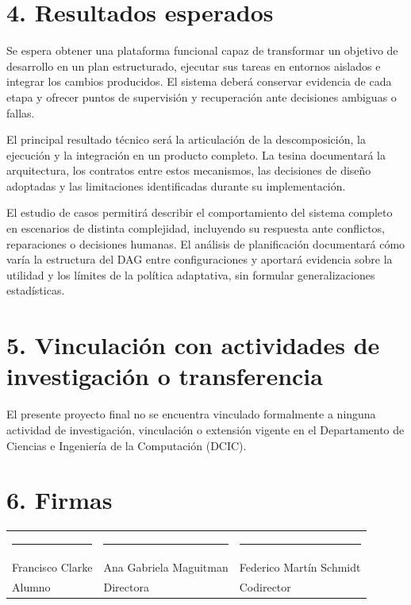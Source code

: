 \documentclass[11pt,a4paper]{article}
\newcommand{\autor}{Francisco Clarke}
\newcommand{\director}{Ana Gabriela Maguitman}
\newcommand{\codirector}{Federico Mart\'in Schmidt}
\begin{document}
\section*{4. Resultados esperados}

Se espera obtener una plataforma funcional capaz de transformar un objetivo de
desarrollo en un plan estructurado, ejecutar sus tareas en entornos aislados e
integrar los cambios producidos. El sistema deber\'a conservar evidencia de cada
etapa y ofrecer puntos de supervisi\'on y recuperaci\'on ante decisiones ambiguas
o fallas.

El principal resultado t\'ecnico ser\'a la articulaci\'on de la descomposici\'on,
la ejecuci\'on y la integraci\'on en un producto completo. La tesina documentar\'a
la arquitectura, los contratos entre estos mecanismos, las decisiones de
dise\~no adoptadas y las limitaciones identificadas durante su implementaci\'on.

El estudio de casos permitir\'a describir el comportamiento del sistema completo
en escenarios de distinta complejidad, incluyendo su respuesta ante conflictos,
reparaciones o decisiones humanas. El an\'alisis de planificaci\'on documentar\'a
c\'omo var\'ia la estructura del DAG entre configuraciones y aportar\'a evidencia
sobre la utilidad y los l\'imites de la pol\'itica adaptativa, sin formular
generalizaciones estad\'isticas.

\section*{5. Vinculaci\'on con actividades de investigaci\'on o transferencia}

El presente proyecto final no se encuentra vinculado formalmente a ninguna
actividad de investigaci\'on, vinculaci\'on o extensi\'on vigente en el
Departamento de Ciencias e Ingenier\'ia de la Computaci\'on (DCIC).

\section*{6. Firmas}

\vspace{1.8cm}
\begin{center}
  \begin{tabularx}{\textwidth}{@{}>{\centering\arraybackslash}X >{\centering\arraybackslash}X >{\centering\arraybackslash}X@{}}
    \rule{4.2cm}{0.4pt} & \rule{4.2cm}{0.4pt} & \rule{4.2cm}{0.4pt} \\
    \autor & \director & \codirector \\
    Alumno & Directora & Codirector
  \end{tabularx}
\end{center}

\clearpage


\end{document}
